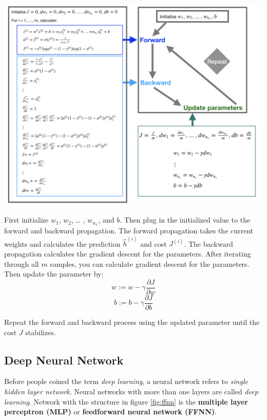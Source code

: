 \documentclass[
  12pt,
]{krantz}
\begin{document}
\includegraphics[width=1\textwidth,height=\textheight]{images/GradientDescent.png}

First initialize \(w_1\), \(w_2\), \ldots{} , \(w_{n_x}\), and \(b\). Then plug in the initialized value to the forward and backward propagation. The forward propagation takes the current weights and calculates the prediction \(\hat{h}^{(i)}\) and cost \(J^{(i)}\). The backward propagation calculates the gradient descent for the parameters. After iterating through all \(m\) samples, you can calculate gradient descent for the parameters. Then update the parameter by:
\[w := w - \gamma \frac{\partial J}{\partial w}\]
\[b := b - \gamma \frac{\partial J}{\partial b}\]

Repeat the forward and backward process using the updated parameter until the cost \(J\) stabilizes.

\hypertarget{deepneuralnetwork}{%
\subsection{Deep Neural Network}\label{deepneuralnetwork}}

Before people coined the term \emph{deep learning}, a neural network refers to \emph{single hidden layer network}. Neural networks with more than one layers are called \emph{deep learning}. Network with the structure in figure \ref{fig:ffnn} is the \textbf{multiple layer perceptron (MLP)} or \textbf{feedforward neural network (FFNN)}.
\end{document}
